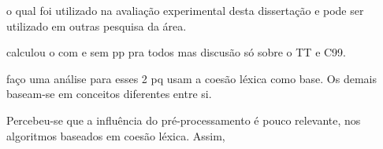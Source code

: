 
o qual foi utilizado na avaliação experimental desta dissertação e pode ser utilizado em outras pesquisa da área.









































calculou o com e sem pp pra todos
mas discusão só sobre o TT e C99.

faço uma análise para esses 2 pq usam a coesão léxica como base. Os demais baseam-se em conceitos diferentes entre si.











































Percebeu-se que a influência do pré-processamento é pouco relevante, nos algoritmos baseados em coesão léxica. Assim, 


